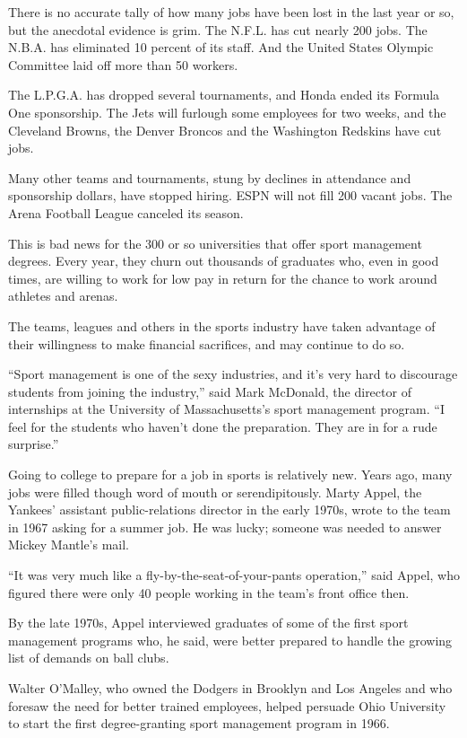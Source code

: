 \documentclass[12pt,a4paper,onecolumn]{article}
\begin{document}
There is no accurate tally of how many jobs have been lost in the last year or so, but the anecdotal
evidence is grim. The N.F.L. has cut nearly 200 jobs. The N.B.A. has eliminated 10 percent of its
staff. And the United States Olympic Committee laid off more than 50 workers.

The L.P.G.A. has dropped several tournaments, and Honda ended its Formula One sponsorship. The Jets
will furlough some employees for two weeks, and the Cleveland Browns, the Denver Broncos and the
Washington Redskins have cut jobs.

Many other teams and tournaments, stung by declines in attendance and sponsorship dollars, have
stopped hiring. ESPN will not fill 200 vacant jobs. The Arena Football League canceled its season.

This is bad news for the 300 or so universities that offer sport management degrees. Every year,
they churn out thousands of graduates who, even in good times, are willing to work for low pay in
return for the chance to work around athletes and arenas.

The teams, leagues and others in the sports industry have taken advantage of their willingness to
make financial sacrifices, and may continue to do so.

``Sport management is one of the sexy industries, and it's very hard to discourage students from
joining the industry,'' said Mark McDonald, the director of internships at the University of
Massachusetts's sport management program. ``I feel for the students who haven't done the
preparation. They are in for a rude surprise.''

Going to college to prepare for a job in sports is relatively new. Years ago, many jobs were filled
though word of mouth or serendipitously. Marty Appel, the Yankees' assistant public-relations
director in the early 1970s, wrote to the team in 1967 asking for a summer job. He was lucky;
someone was needed to answer Mickey Mantle's mail.

``It was very much like a fly-by-the-seat-of-your-pants operation,'' said Appel, who figured there
were only 40 people working in the team's front office then.

By the late 1970s, Appel interviewed graduates of some of the first sport management programs who,
he said, were better prepared to handle the growing list of demands on ball clubs.

Walter O'Malley, who owned the Dodgers in Brooklyn and Los Angeles and who foresaw the need for
better trained employees, helped persuade Ohio University to start the first degree-granting sport
management program in 1966.
\end{document}
